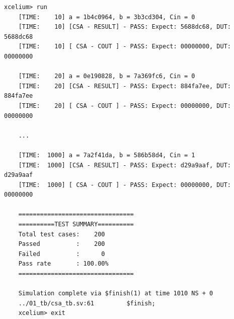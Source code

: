 \begin{lstlisting}[style=StyleResult, language=Result, caption={Kết quả kiểm định cho thiết kế CSA 32 bit.}]
	xcelium> run
	[TIME:    10] a = 1b4c0964, b = 3b3cd304, Cin = 0
	[TIME:    10] [CSA - RESULT] - PASS: Expect: 5688dc68, DUT: 5688dc68 
	[TIME:    10] [ CSA - COUT ] - PASS: Expect: 00000000, DUT: 00000000 
	
	[TIME:    20] a = 0e190828, b = 7a369fc6, Cin = 0
	[TIME:    20] [CSA - RESULT] - PASS: Expect: 884fa7ee, DUT: 884fa7ee 
	[TIME:    20] [ CSA - COUT ] - PASS: Expect: 00000000, DUT: 00000000 

	...
	
	[TIME:  1000] a = 7a2f41da, b = 586b58d4, Cin = 1
	[TIME:  1000] [CSA - RESULT] - PASS: Expect: d29a9aaf, DUT: d29a9aaf 
	[TIME:  1000] [ CSA - COUT ] - PASS: Expect: 00000000, DUT: 00000000 
	
	================================
	==========TEST SUMMARY==========
	Total test cases:    200   
	Passed          :    200   
	Failed          :      0  
	Pass rate       : 100.00%
	================================
	
	Simulation complete via $finish(1) at time 1010 NS + 0
	../01_tb/csa_tb.sv:61         $finish;
	xcelium> exit 
\end{lstlisting}





  

